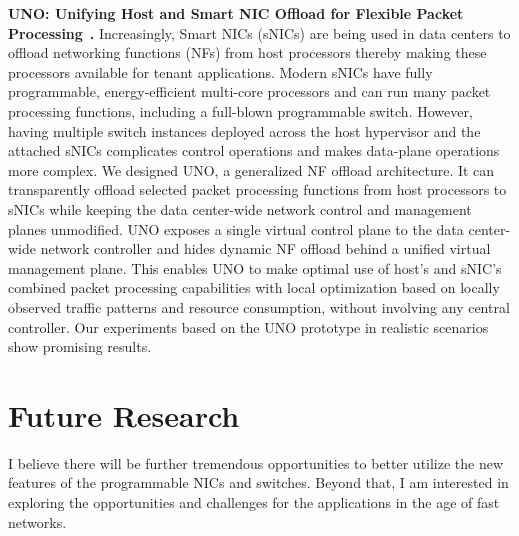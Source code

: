 \documentclass[10pt]{article}
\begin{document}
\textbf{UNO: Unifying Host and Smart NIC Offload for Flexible Packet
Processing}~\cite{uno:le}\textbf{.} Increasingly, Smart NICs (sNICs) are being used
in data centers to offload networking functions (NFs) from host
processors thereby making these processors available for tenant applications.
Modern sNICs have fully programmable, energy-efficient
multi-core processors and can run many packet processing functions,
including a full-blown programmable switch. However, 
having multiple switch instances deployed across the host hypervisor
and the attached sNICs complicates control operations and makes
data-plane operations more complex.
We designed UNO, a generalized NF offload
architecture. It can transparently offload selected packet processing functions from host processors to sNICs while keeping the data center-wide
network control and management planes unmodified. UNO
exposes a single virtual control plane to the data center-wide network controller and
hides dynamic NF offload behind a unified virtual management
plane. This enables UNO to make optimal use of host’s and sNIC’s
combined packet processing capabilities with local optimization
based on locally observed traffic patterns and resource consumption, 
without involving any central controller. Our experiments based 
on the UNO prototype in realistic scenarios show promising
results.


\section*{Future Research}
I believe there will be further tremendous opportunities to better utilize the new features of the programmable NICs and switches. Beyond that, I am interested in exploring the opportunities and challenges for the applications in the age of fast networks. 
\end{document}
